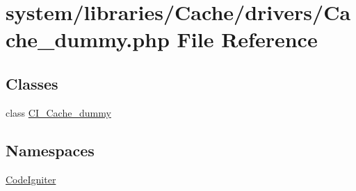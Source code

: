 \hypertarget{_cache__dummy_8php}{}\section{system/libraries/\+Cache/drivers/\+Cache\+\_\+dummy.php File Reference}
\label{_cache__dummy_8php}
\subsection*{Classes}
\begin{DoxyCompactItemize}
\item 
class \mbox{\hyperlink{class_c_i___cache__dummy}{C\+I\+\_\+\+Cache\+\_\+dummy}}
\end{DoxyCompactItemize}
\subsection*{Namespaces}
\begin{DoxyCompactItemize}
\item 
 \mbox{\hyperlink{namespace_code_igniter}{Code\+Igniter}}
\end{DoxyCompactItemize}
